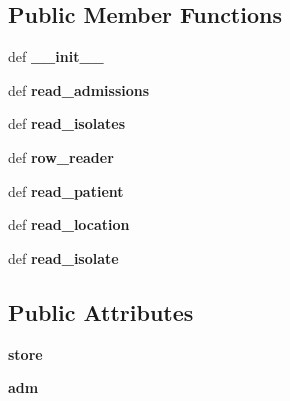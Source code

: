 \subsection*{Public Member Functions}
\begin{DoxyCompactItemize}
\item 
\hypertarget{classinterfaces_1_1scbu_1_1_s_c_b_u___importer_a4310e98f8f35790aacf05b93ead2c82d}{def {\bfseries \-\_\-\-\_\-init\-\_\-\-\_\-}}\label{classinterfaces_1_1scbu_1_1_s_c_b_u___importer_a4310e98f8f35790aacf05b93ead2c82d}

\item 
\hypertarget{classinterfaces_1_1scbu_1_1_s_c_b_u___importer_a06971583e80184b2a9df31e9851ffc82}{def {\bfseries read\-\_\-admissions}}\label{classinterfaces_1_1scbu_1_1_s_c_b_u___importer_a06971583e80184b2a9df31e9851ffc82}

\item 
\hypertarget{classinterfaces_1_1scbu_1_1_s_c_b_u___importer_af33ca39f561a06a52cd587e69dc1c5fb}{def {\bfseries read\-\_\-isolates}}\label{classinterfaces_1_1scbu_1_1_s_c_b_u___importer_af33ca39f561a06a52cd587e69dc1c5fb}

\item 
\hypertarget{classinterfaces_1_1scbu_1_1_s_c_b_u___importer_a7c8ddb25c73b2ce5964dd8f3d66d1d4f}{def {\bfseries row\-\_\-reader}}\label{classinterfaces_1_1scbu_1_1_s_c_b_u___importer_a7c8ddb25c73b2ce5964dd8f3d66d1d4f}

\item 
\hypertarget{classinterfaces_1_1scbu_1_1_s_c_b_u___importer_aae60a9a7be72f16395ce06e97319a3b9}{def {\bfseries read\-\_\-patient}}\label{classinterfaces_1_1scbu_1_1_s_c_b_u___importer_aae60a9a7be72f16395ce06e97319a3b9}

\item 
\hypertarget{classinterfaces_1_1scbu_1_1_s_c_b_u___importer_a25f7c85b5c6ef410f4058642309b527f}{def {\bfseries read\-\_\-location}}\label{classinterfaces_1_1scbu_1_1_s_c_b_u___importer_a25f7c85b5c6ef410f4058642309b527f}

\item 
\hypertarget{classinterfaces_1_1scbu_1_1_s_c_b_u___importer_a28452dce028c58a59319075970f2bf9b}{def {\bfseries read\-\_\-isolate}}\label{classinterfaces_1_1scbu_1_1_s_c_b_u___importer_a28452dce028c58a59319075970f2bf9b}

\end{DoxyCompactItemize}
\subsection*{Public Attributes}
\begin{DoxyCompactItemize}
\item 
\hypertarget{classinterfaces_1_1scbu_1_1_s_c_b_u___importer_af44236e3ec523c91419ffa313387270c}{{\bfseries store}}\label{classinterfaces_1_1scbu_1_1_s_c_b_u___importer_af44236e3ec523c91419ffa313387270c}

\item 
\hypertarget{classinterfaces_1_1scbu_1_1_s_c_b_u___importer_a8c3130ff35d647076ccb5af26c2272f4}{{\bfseries adm}}\label{classinterfaces_1_1scbu_1_1_s_c_b_u___importer_a8c3130ff35d647076ccb5af26c2272f4}

\end{DoxyCompactItemize}
